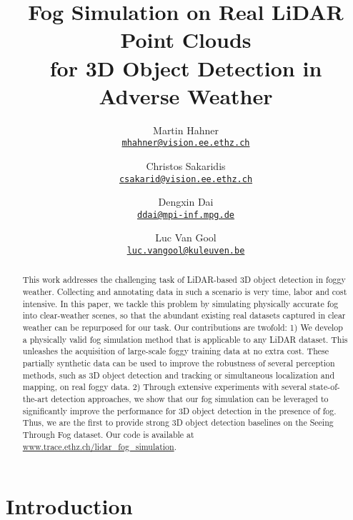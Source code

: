 \documentclass[10pt,twocolumn,letterpaper]{article}
\begin{document}
\title{\vspace{-0.4cm}Fog Simulation on Real LiDAR Point Clouds \\ for 3D Object Detection in Adverse Weather}

\author{Martin Hahner \\
{\tt\scriptsize \href{mailto:mhahner@vision.ee.ethz.ch}{mhahner@vision.ee.ethz.ch}}
\and
Christos Sakaridis \\
{\tt\scriptsize \href{mailto:csakarid@vision.ee.ethz.ch}{csakarid@vision.ee.ethz.ch}}
\and
Dengxin Dai \\
{\tt\scriptsize \href{mailto:ddai@mpi-inf.mpg.de}{ddai@mpi-inf.mpg.de}}
\and
Luc Van Gool \\
{\tt\scriptsize \href{mailto:luc.vangool@kuleuven.be}{luc.vangool@kuleuven.be}}
\and
\and
\and
}

\maketitle
%
 
\begin{abstract}
   This work addresses the challenging task of LiDAR-based 3D object detection in foggy weather. 
   Collecting and annotating data in such a scenario is very time, labor and cost intensive. 
   In this paper, we tackle this problem by simulating physically accurate fog into clear-weather scenes, so that the abundant existing real datasets captured in clear weather can be repurposed for our task. 
   Our contributions are twofold:
   1) We develop a physically valid fog simulation method that is applicable to any LiDAR dataset. This unleashes the acquisition of large-scale foggy training data at no extra cost. These partially synthetic data can be used to improve the robustness of several perception methods, such as 3D object detection and tracking or simultaneous localization and mapping, on real foggy data.
   2) Through extensive experiments with several state-of-the-art detection approaches, we show that our fog simulation can be leveraged to significantly improve the performance for 3D object detection in the presence of fog. Thus, we are the first to provide strong 3D object detection baselines on the Seeing Through Fog dataset. Our code is available at \href{https://trace.ethz.ch/lidar_fog_simulation}{www.trace.ethz.ch/lidar\_fog\_simulation}.
\end{abstract}

%
 \section{Introduction}
\label{sec:intro}
\end{document}
